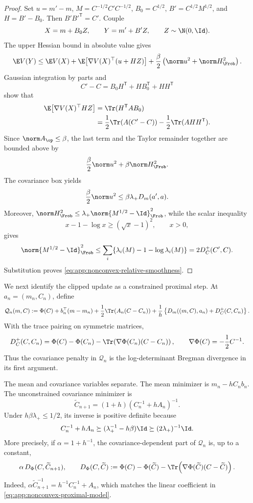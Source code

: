 \begin{proof}
Set \(u=m'-m\),
\(M=C^{-1/2}C'C^{-1/2}\),
\(B_0=C^{1/2}\),
\(B'=C^{1/2}M^{1/2}\), and \(H=B'-B_0\).  Then
\(B'B'^{\mathsf T}=C'\).  Couple
\[
  X=m+B_0Z,
  \qquad
  Y=m'+B'Z,
  \qquad Z\sim\N(0,\Id).
\]
The upper Hessian bound in absolute value gives
\[
  \E V(Y)
  \leq
  \E V(X)
  +\E\!\left[\nabla V(X)^\top(u+HZ)\right]
  +\frac\beta2\left(\norm u^2+\norm H_{\Frob}^2\right).
\]
Gaussian integration by parts and
\[
  C'-C=B_0H^{\mathsf T}+HB_0^{\mathsf T}+HH^{\mathsf T}
\]
show that
\begin{align*}
  \E\!\left[\nabla V(X)^\top HZ\right]
  &=\Tr(H^{\mathsf T}AB_0)\\
  &=\frac12\Tr\!\left(A(C'-C)\right)
    -\frac12\Tr(AHH^{\mathsf T}).
\end{align*}
Since \(\norm A_{\op}\leq\beta\), the last term and the Taylor remainder
together are bounded above by
\[
  \frac\beta2\norm u^2+\beta\norm H_{\Frob}^2.
\]
The covariance box yields
\[
  \frac\beta2\norm u^2
  \leq\beta\lambda_+D_m(a',a).
\]
Moreover,
\(\norm H_{\Frob}^2
\leq\lambda_+\norm{M^{1/2}-\Id}_{\Frob}^2\), while the scalar inequality
\[
  x-1-\log x\geq(\sqrt x-1)^2,
  \qquad x>0,
\]
gives
\[
  \norm{M^{1/2}-\Id}_{\Frob}^2
  \leq
  \sum_i\{\lambda_i(M)-1-\log\lambda_i(M)\}
  =2D_C^+(C',C).
\]
Substitution proves \eqref{eq:app:nonconvex-relative-smoothness}.
\end{proof}

We next identify the clipped update as a constrained proximal step.  At
\(a_n=(m_n,C_n)\), define
\begin{equation}
\label{eq:app:nonconvex-proximal-model}
  \mathcal Q_n(m,C)
  :=
  \Phi(C)+b_n^\top(m-m_n)
  +\frac12\Tr\!\left(A_n(C-C_n)\right)
  +\frac1h\left\{D_m((m,C),a_n)+D_C^+(C,C_n)\right\}.
\end{equation}
With the trace pairing on symmetric matrices,
\begin{equation}
  D_C^+(C,C_n)
  =\Phi(C)-\Phi(C_n)
   -\Tr\!\left(\nabla\Phi(C_n)(C-C_n)\right),
  \qquad
  \nabla\Phi(C)=-\frac12C^{-1}.
  \label{eq:app:nonconvex-forward-is-bregman}
\end{equation}
Thus the covariance penalty in \(\mathcal Q_n\) is the
log-determinant Bregman divergence in its first argument.

The mean and covariance variables separate.  The mean minimizer is
\(m_n-hC_nb_n\).  The unconstrained covariance minimizer is
\[
  \widetilde C_{n+1}
  =(1+h)(C_n^{-1}+hA_n)^{-1}.
\]
Under
\(h\beta\lambda_+\leq1/2\), its inverse is positive definite because
\[
  C_n^{-1}+hA_n
  \succeq(\lambda_+^{-1}-h\beta)\Id
  \succeq(2\lambda_+)^{-1}\Id.
\]
More precisely, if \(\alpha=1+h^{-1}\), the covariance-dependent part of
\(\mathcal Q_n\) is, up to a constant,
\begin{equation}
  \alpha\,D_\Phi(C,\widetilde C_{n+1}),
  \qquad
  D_\Phi(C,\widetilde C)
  :=\Phi(C)-\Phi(\widetilde C)
    -\Tr\!\left(\nabla\Phi(\widetilde C)(C-\widetilde C)\right).
  \label{eq:app:nonconvex-proximal-bregman-form}
\end{equation}
Indeed,
\(\alpha\widetilde C_{n+1}^{-1}=h^{-1}C_n^{-1}+A_n\), which matches the
linear coefficient in \eqref{eq:app:nonconvex-proximal-model}.

